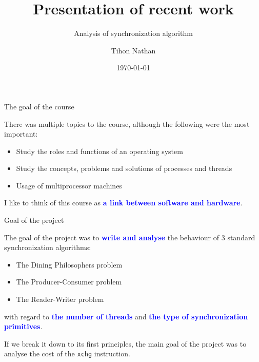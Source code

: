 \documentclass{beamer}
\title{Presentation of recent work}
\subtitle{Analysis of synchronization algorithm}
\author{Tihon Nathan}
\date{\today}
\newcommand{\textblue}[1]{\textbf{\textcolor{blue}{#1}}}
\begin{document}
\begin{frame}{\titlepage}
\end{frame}



\begin{frame}{The goal of the course}

  There was multiple topics to the course, although the following were the most important:

  \bigskip

  \begin{itemize}
    \item Study the roles and functions of an operating system
    \item Study the concepts, problems and solutions of processes and threads
    \item Usage of multiprocessor machines
  \end{itemize}

  \bigskip

  I like to think of this course as \textblue{a link between software and hardware}.

\end{frame}

\begin{frame}{Goal of the project}

  The goal of the project was to \textblue{write and analyse} the behaviour of 3 standard synchronization algorithms:

  \bigskip

  \begin{itemize}
    \item The Dining Philosophers problem
    \item The Producer-Consumer problem
    \item The Reader-Writer problem
  \end{itemize}

  \bigskip

  with regard to \textblue{the number of threads} and \textblue{the type of synchronization primitives}.

  \bigskip

  If we break it down to its first principles, the main goal of the project was to analyse the cost of the \texttt{xchg} instruction.

\end{frame}
\end{document}
